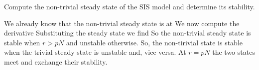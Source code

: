 

Compute the non-trivial steady state of the SIS model
and determine its stability.

\solution 
We already know that the non-trivial steady state is at 
We now compute the derivative 
Substituting the steady state we find 
So the non-trivial steady state is stable when $r>pN$ and unstable otherwise. So, the non-tirivial state is stable when the trivial steady state is unstable and, vice versa. At $r=pN$ the two states meet and exchange their stability. 
